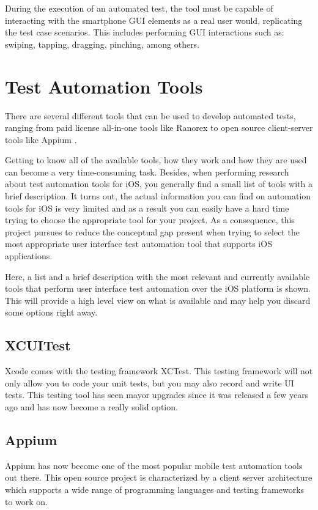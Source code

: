 During the execution of an automated test, the tool must be capable of interacting with the smartphone GUI elements as a real user would, replicating the test case scenarios. This includes performing GUI interactions such as: swiping, tapping, dragging, pinching, among others.


\section{Test Automation Tools}

There are several different tools that can be used to develop automated tests, ranging from paid license all-in-one tools like Ranorex \cite{Ranorex} to open source client-server tools like Appium \cite{Appium}. 

Getting to know all of the available tools, how they work and how they are used can become a very time-consuming task. Besides, when performing research about test automation tools for iOS, you generally find a small list of tools with a brief description. It turns out, the actual information you can find on automation tools for iOS is very limited and as a result you can easily have a hard time trying to choose the appropriate tool for your project. As a consequence, this project pursues to reduce the conceptual gap present when trying to select the most appropriate user interface test automation tool that supports iOS applications.

Here, a list and a brief description with the most relevant and currently available tools that perform user interface test automation over the iOS platform is shown. This will provide a high level view on what is available and may help you discard some options right away.

\subsection {XCUITest}
Xcode comes with the testing framework XCTest. This testing framework will not only allow you to code your unit tests, but you may also record and write UI tests. This testing tool has seen mayor upgrades since it was released a few years ago and has now become a really solid option. \cite{XCUITest}

\subsection {Appium}
Appium has now become one of the most popular mobile test automation tools out there. This open source project is characterized by a client server architecture which supports a wide range of programming languages and testing frameworks to work on. \cite{Appium}

